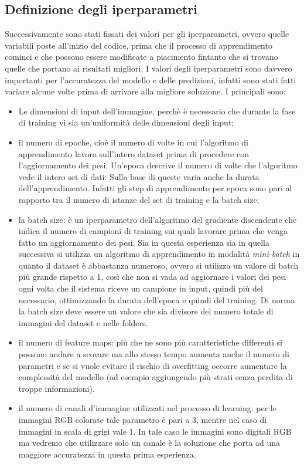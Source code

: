 \subsection{Definizione degli iperparametri}
Successivamente sono stati fissati dei valori per gli iperparametri, ovvero quelle 
variabili poste all'inizio del codice, prima che il processo di apprendimento cominci e che possono essere modificate a piacimento fintanto che si trovano quelle che portano ai risultati migliori. 
I valori degli iperparametri sono davvero importanti per l’accuratezza del modello e delle predizioni, infatti sono stati fatti variare alcune volte prima di arrivare alla migliore soluzione. I principali sono: 
\begin{itemize}
\item Le dimensioni di input dell’immagine, perchè è necessario che durante la fase di training vi sia un'uniformità delle dimensioni degli input;
\item il numero di epoche, cioè il numero di volte in cui l’algoritmo di apprendimento 
lavora sull’intero dataset prima di procedere con l’aggiornamento dei pesi. Un'epoca descrive il numero di volte che l'algoritmo vede il intero set di dati.
Sulla base di queste varia anche la durata dell’apprendimento. Infatti gli step di apprendimento
 per epoca sono pari al rapporto tra il numero di istanze del set di training e la batch size;
\item la batch size: è un iperparametro dell’algoritmo del gradiente discendente che indica il numero di campioni di training sui quali lavorare prima che venga fatto un aggiornamento dei pesi. Sia in questa esperienza sia in quella successiva si utilizza un algoritmo di apprendimento in modalità \emph{mini-batch} in quanto il dataset è abbastanza numeroso, ovvero si utilizza un valore di batch più grande rispetto a 1, così che non si vada ad aggiornare i valori dei pesi ogni volta che il sistema riceve un campione in input, quindi più del necessario, ottimizzando la durata dell'epoca e quindi del training. Di norma la batch size deve essere un valore che sia divisore del numero totale di immagini del dataset e nelle folders. 
\item il numero di feature maps: più che ne sono più caratteristiche differenti si possono
 andare a scovare ma allo stesso tempo aumenta anche il numero di parametri e se si vuole evitare 
 il rischio di overfitting occorre aumentare la complessità del modello (ad esempio aggiungendo più strati senza perdita di troppe informazioni).
\item il numero di canali d'immagine utilizzati nel processo di learning: per le immagini RGB colorate tale parametro è pari a 3, mentre nel caso di immagini in scala di grigi vale 1. In tale caso le immagini sono digitali RGB ma vedremo che utilizzare solo un canale è la soluzione che porta ad una maggiore accuratezza in questa prima esperienza.
\end{itemize}


